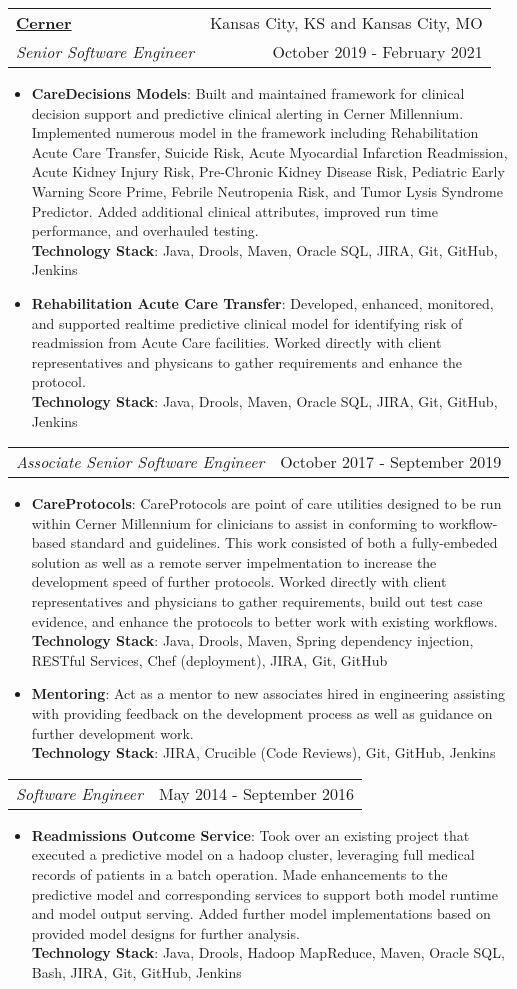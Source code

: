 \documentclass[letterpaper,11pt]{article}
\makeatletter
\newcommand{\resumeItemWithTech}[3]{
  \item\small{
    \textbf{#1}{: #2 \vspace{-2pt}}\\
    \textbf{Technology Stack}{: #3 \vspace{-2pt}}
  }
}
\newcommand{\resumeCompanyStart}{\vspace{-1pt}\item\begin{tabular*}{0.97\textwidth}{l@{\extracolsep{\fill}}r}}
\newcommand{\resumeCompanyEnd}{\end{tabular*}\vspace{-5pt}}
\newcommand{\resumeCompany}[2]{
  \textbf{#1} & #2 \\
}
\newcommand{\resumeJobTitle}[2]{
  \textit{\small#1} & {\small#2} \\
}
\newcommand{\resumeItemListStart}{\begin{itemize}}
\newcommand{\resumeItemListEnd}{\end{itemize}\vspace{-5pt}}
\makeatother
\begin{document}
    \resumeCompanyStart
      \resumeCompany{\href{https://cerner.com}{Cerner}}{Kansas City, KS and Kansas City, MO}
      \resumeJobTitle{Senior Software Engineer}{October 2019 - February 2021}
    \resumeCompanyEnd
    \resumeItemListStart
      \resumeItemWithTech{CareDecisions Models}
        {Built and maintained framework for clinical decision support and predictive clinical alerting in Cerner Millennium. Implemented numerous model in the framework including Rehabilitation Acute Care Transfer, Suicide Risk, Acute Myocardial Infarction Readmission, Acute Kidney Injury Risk, Pre-Chronic Kidney Disease Risk, Pediatric Early Warning Score Prime, Febrile Neutropenia Risk, and Tumor Lysis Syndrome Predictor. Added additional clinical attributes, improved run time performance, and overhauled testing.}
        {Java, Drools, Maven, Oracle SQL, JIRA, Git, GitHub, Jenkins}
      \resumeItemWithTech{Rehabilitation Acute Care Transfer}
        {Developed, enhanced, monitored, and supported realtime predictive clinical model for identifying risk of readmission from Acute Care facilities.  Worked directly with client representatives and physicans to gather requirements and enhance the protocol.}
        {Java, Drools, Maven, Oracle SQL, JIRA, Git, GitHub, Jenkins}
    \resumeItemListEnd
    \resumeCompanyStart
      \resumeJobTitle{Associate Senior Software Engineer}{October 2017 - September 2019}
    \resumeCompanyEnd
    \resumeItemListStart
      \resumeItemWithTech{CareProtocols}
        {CareProtocols are point of care utilities designed to be run within Cerner Millennium for clinicians to assist in conforming to workflow-based standard and guidelines. This work consisted of both a fully-embeded solution as well as a remote server impelmentation to increase the development speed of further protocols. Worked directly with client representatives and physicians to gather requirements, build out test case evidence, and enhance the protocols to better work with existing workflows. }
        {Java, Drools, Maven, Spring dependency injection, RESTful Services, Chef (deployment), JIRA, Git, GitHub}
      \resumeItemWithTech{Mentoring}
        {Act as a mentor to new associates hired in engineering assisting with providing feedback on the development process as well as guidance on further development work.}
        {JIRA, Crucible (Code Reviews), Git, GitHub, Jenkins}
    \resumeItemListEnd
    \resumeCompanyStart
      \resumeJobTitle{Software Engineer}{May 2014 - September 2016}
    \resumeCompanyEnd
    \resumeItemListStart
      \resumeItemWithTech{Readmissions Outcome Service}
        {Took over an existing project that executed a predictive model on a hadoop cluster, leveraging full medical records of patients in a batch operation. Made enhancements to the predictive model and corresponding services to support both model runtime and model output serving. Added further model implementations based on provided model designs for further analysis.}
        {Java, Drools, Hadoop MapReduce, Maven, Oracle SQL, Bash, JIRA, Git, GitHub, Jenkins}
    \resumeItemListEnd
\end{document}
